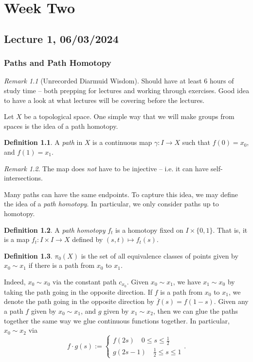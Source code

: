 \documentclass[a4paper]{report}
\theoremstyle{definition}
\newtheorem{definition}{Definition}
\theoremstyle{remark}
\newtheorem{remark}{Remark}
\theoremstyle{proposition}
\theoremstyle{conjecture}
\theoremstyle{lemma}
\theoremstyle{corollary}
\theoremstyle{exercise}
\begin{document}
\chapter{Week Two}

\section{Lecture 1, 06/03/2024}

\subsection{Paths and Path Homotopy}

\begin{remark}[Unrecorded Diarmuid Wisdom]
    Should have at least $6$ hours of study time -- both prepping for lectures
    and working through exercises. Good idea to have a look at what lectures
    will be covering before the lectures.
\end{remark}

Let $X$ be a topological space. One simple way that we will make groups from
spaces is the idea of a path homotopy.

\begin{definition}
    A \emph{path} in $X$ is a continuous map $\gamma : I \to X$ such that 
    $f(0) = x_0$, and $f(1) = x_1$. 
\end{definition}

\begin{remark}
    The map does \emph{not} have to be injective -- i.e. it can have 
    self-intersections. 
\end{remark}

Many paths can have the same endpoints. To capture this idea, we may 
define the idea of a \emph{path homotopy}. In particular, 
we only consider paths up to homotopy.

\begin{definition}
    A \emph{path homotopy} $f_t$ is a homotopy fixed on 
    $I \times \lbrace 0,1\rbrace$.
    That is, it is a map $f_t : I \times I \to X$ defined by 
    $(s,t) \mapsto f_t(s)$.
\end{definition}

\begin{definition}
    $\pi_0(X)$ is the set of all equivalence classes of points 
    given by $x_0 \sim x_1$ if there is a path from $x_0$ to $x_1$.
\end{definition}

Indeed, $x_0 \sim x_0$ via the constant path $c_{x_0}$. Given $x_0 \sim x_1$,
we have $x_1 \sim x_0$ by taking the path going in the opposite direction.
If $f$ is a path from $x_0$ to $x_1$, we denote the path going in
the opposite direction by $\overline{f}(s) = f(1-s)$.
Given any a path $f$ given by $x_0 \sim x_1$, and $g$ given by $x_1 \sim x_2$, 
then we can glue the paths together the same way we glue continuous functions
together. In particular, $x_0 \sim x_2$ via 
$$f \cdot g (s) := \begin{cases}
    f(2s) \quad 0\leq s \leq \frac{1}{2}\\
    g(2s-1) \quad \frac{1}{2} \leq s \leq 1
\end{cases}.$$
\end{document}
